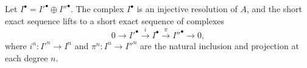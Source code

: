 \begin{lemma}
\begin{enumerate}
        \begin{center}
        \end{center}
        Let $I^\bullet = I'^\bullet \oplus I''^\bullet$. The complex $I^\bullet$ is an injective resolution of $A$, and the short exact sequence lifts to a short exact sequence of complexes
        $$0 \to I'^\bullet \xrightarrow{i} I^\bullet \xrightarrow{\pi} I''^\bullet \to 0,$$
        where $i^n: I'^n \to I^n$ and $\pi^n: I^n \to I''^n$ are the natural inclusion and projection at each degree \(n\).
    \end{enumerate}
\end{lemma}

